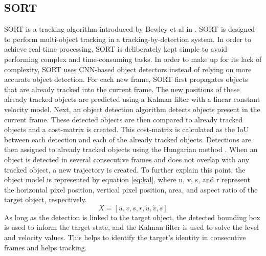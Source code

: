 \subsection{SORT}
SORT is a tracking algorithm introduced by Bewley et al in \cite{DBLP:journals/corr/BewleyGORU16}. SORT is designed to perform multi-object tracking in a tracking-by-detection system. In order to achieve real-time processing, SORT is deliberately kept simple to avoid performing complex and time-consuming tasks. In order to make up for its lack of complexity, SORT uses CNN-based object detectors instead of relying on more accurate object detection. 
For each new frame, SORT first propagates objects that are already tracked into the current frame. The new positions of these already tracked objects are predicted using a Kalman filter \cite{10.1115/1.3662552} with a linear constant velocity model. Next, an object detection algorithm detects objects present in the current frame. These detected objects are then compared to already tracked objects and a cost-matrix is created. This cost-matrix is calculated as the IoU between each detection and each of the already tracked objects. Detections are then assigned to already tracked objects using the Hungarian method \cite{doi:10.1002/nav.3800020109}. When an object is detected in several consecutive frames and does not overlap with any tracked object, a new trajectory is created. To further explain this point, the object model is represented by equation \ref{eq:kal}, where u, v, s, and r represent the horizontal pixel position, vertical pixel position, area, and aspect ratio of the target object, respectively.
\begin{equation}
	\label{eq:kal}
	X=[u, v, s, r, \dot{u}, \dot{v}, \dot{s}]
\end{equation}
As long as the detection is linked to the target object, the detected bounding box is used to inform the target state, and the Kalman filter is used to solve the level and velocity values. This helps to identify the target's identity in consecutive frames and helps tracking.
